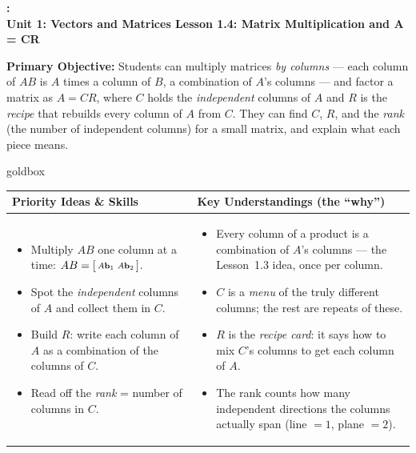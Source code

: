 \documentclass[10pt]{article}
\newcommand{\bb}{\mathbf{b}}
\newcommand{\UnitNumberName}{Unit 1: Vectors and Matrices \quad}
\newcommand{\LessonNumberName}{Lesson 1.4: Matrix Multiplication and A = CR}
\begin{document}
\begin{center}
    {\Large\bfseries \CourseName: \SchoolYear \\
    {\small\bfseries \UnitNumberName \LessonNumberName}}
\end{center}

\begin{tcolorbox}[colback=blush, colframe=burgundy, boxrule=0.9pt, arc=2mm,
    left=2mm, right=2mm, top=1.5mm, bottom=1.5mm]
    \textbf{Primary Objective:} Students can multiply matrices \emph{by columns} --- each column
    of $AB$ is $A$ times a column of $B$, a combination of $A$'s columns --- and factor a matrix as
    $A=CR$, where $C$ holds the \emph{independent} columns of $A$ and $R$ is the \emph{recipe} that
    rebuilds every column of $A$ from $C$. They can find $C$, $R$, and the \emph{rank} (the number
    of independent columns) for a small matrix, and explain what each piece means.
\end{tcolorbox}

\renewcommand{\arraystretch}{1.4}
\begin{skillbox}{goldbox}
\begin{tabularx}{\linewidth}{@{}X|X@{}}
\textbf{Priority Ideas \& Skills} & \textbf{Key Understandings (the ``why'')} \\[2pt]
\hline
\vspace{-6pt}
\begin{itemize}[leftmargin=1.1em, nosep, after=\vspace{2pt}]
  \item Multiply $AB$ one column at a time: $AB=\begin{bsmallmatrix} A\bb_1 & A\bb_2 \end{bsmallmatrix}$.
  \item Spot the \emph{independent} columns of $A$ and collect them in $C$.
  \item Build $R$: write each column of $A$ as a combination of the columns of $C$.
  \item Read off the \emph{rank} = number of columns in $C$.
\end{itemize}
&
\vspace{-6pt}
\begin{itemize}[leftmargin=1.1em, nosep, after=\vspace{2pt}]
  \item Every column of a product is a combination of $A$'s columns --- the Lesson~1.3 idea, once per column.
  \item $C$ is a \emph{menu} of the truly different columns; the rest are repeats of these.
  \item $R$ is the \emph{recipe card}: it says how to mix $C$'s columns to get each column of $A$.
  \item The rank counts how many independent directions the columns actually span (line $=1$, plane $=2$).
\end{itemize}
\end{tabularx}
\end{skillbox}
\end{document}
